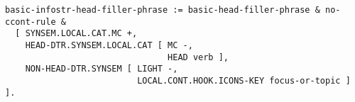 \documentclass[a4paper]{article}
\begin{document}
{\small\begin{verbatim}
basic-infostr-head-filler-phrase := basic-head-filler-phrase & no-ccont-rule &
  [ SYNSEM.LOCAL.CAT.MC +,
    HEAD-DTR.SYNSEM.LOCAL.CAT [ MC -,
                                HEAD verb ],
    NON-HEAD-DTR.SYNSEM [ LIGHT -,
                          LOCAL.CONT.HOOK.ICONS-KEY focus-or-topic ] ].
\end{verbatim}}
\end{document}

